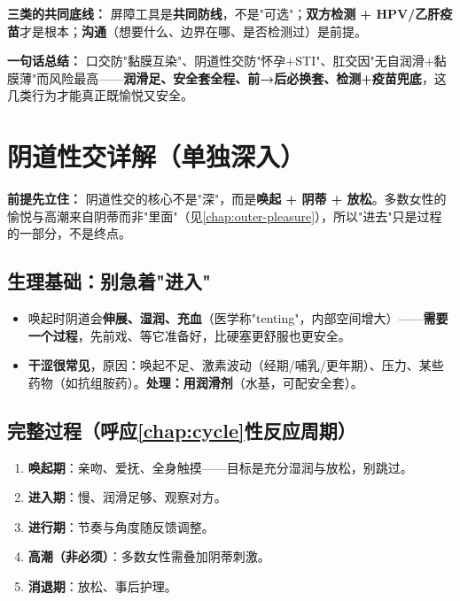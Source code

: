 \documentclass[12pt,UTF8,openany]{ctexbook}
\begin{document}
\vspace{1em}
\noindent\textbf{三类的共同底线：} 屏障工具是\textbf{共同防线}，不是"可选"；\textbf{双方检测 + HPV/乙肝疫苗}才是根本；\textbf{沟通}（想要什么、边界在哪、是否检测过）是前提。

\noindent\textbf{一句话总结：} 口交防"黏膜互染"、阴道性交防"怀孕+STI"、肛交因"无自润滑+黏膜薄"而风险最高——\textbf{润滑足、安全套全程、前→后必换套、检测+疫苗兜底}，这几类行为才能真正既愉悦又安全。

\chapter{阴道性交详解（单独深入）}
\label{chap:vaginal}

\noindent\textbf{前提先立住：} 阴道性交的核心不是"深"，而是\textbf{唤起 + 阴蒂 + 放松}。多数女性的愉悦与高潮来自阴蒂而非"里面"（见\ref{chap:outer-pleasure}），所以"进去"只是过程的一部分，不是终点。

\section{生理基础：别急着"进入"}

\begin{itemize}[leftmargin=2em,itemsep=0.3em]
  \item 唤起时阴道会\textbf{伸展、湿润、充血}（医学称"tenting"，内部空间增大）——\textbf{需要一个过程}，先前戏、等它准备好，比硬塞更舒服也更安全。
  \item \textbf{干涩很常见}，原因：唤起不足、激素波动（经期/哺乳/更年期）、压力、某些药物（如抗组胺药）。\textbf{处理：用润滑剂}（水基，可配安全套）。
\end{itemize}

\section{完整过程（呼应\ref{chap:cycle}性反应周期）}

\begin{enumerate}[leftmargin=2em,itemsep=0.3em]
  \item \textbf{唤起期}：亲吻、爱抚、全身触摸——目标是充分湿润与放松，别跳过。
  \item \textbf{进入期}：慢、润滑足够、观察对方。
  \item \textbf{进行期}：节奏与角度随反馈调整。
  \item \textbf{高潮（非必须）}：多数女性需叠加阴蒂刺激。
  \item \textbf{消退期}：放松、事后护理。
\end{enumerate}
\end{document}

